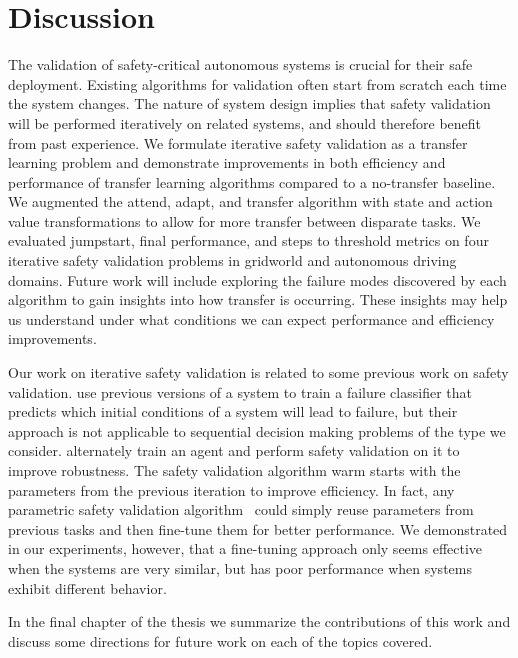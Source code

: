 \section{Discussion}
The validation of safety-critical autonomous systems is crucial for their safe deployment. Existing algorithms for validation often start from scratch each time the system changes. The nature of system design implies that safety validation will be performed iteratively on related systems, and should therefore benefit from past experience. We formulate iterative safety validation as a transfer learning problem and demonstrate improvements in both efficiency and performance of transfer learning algorithms compared to a no-transfer baseline. We augmented the attend, adapt, and transfer algorithm with state and action value transformations to allow for more transfer between disparate tasks. We evaluated jumpstart, final performance, and steps to threshold metrics on four iterative safety validation problems in gridworld and autonomous driving domains. Future work will include exploring the failure modes discovered by each algorithm to gain insights into how transfer is occurring. These insights may help us understand under what conditions we can expect performance and efficiency improvements.

Our work on iterative safety validation is related to some previous work on safety validation. \textcite{uesato2019rigorous} use previous versions of a system to train a failure classifier that predicts which initial conditions of a system will lead to failure, but their approach is not applicable to sequential decision making problems of the type we consider. \textcite{wang2020falsification} alternately train an agent and perform safety validation on it to improve robustness. The safety validation algorithm warm starts with the parameters from the previous iteration to improve efficiency. In fact, any parametric safety validation algorithm~\cite{koren2018adaptive, Akazaki2018falsification, kim2016improving} could simply reuse parameters from previous tasks and then fine-tune them for better performance. We demonstrated in our experiments, however, that a fine-tuning approach only seems effective when the systems are very similar, but has poor performance when systems exhibit different behavior.

In the final chapter of the thesis we summarize the contributions of this work and discuss some directions for future work on each of the topics covered. 